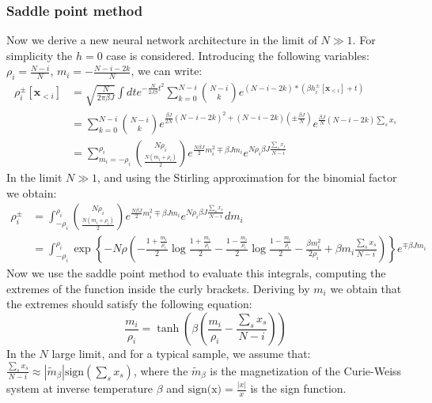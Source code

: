 \documentclass{article}
\begin{document}
\subsubsection{Saddle point method}
Now we derive a new neural network architecture in the limit of $N \gg 1$. For simplicity the $h=0$ case is considered. Introducing the following variables: $\rho_i = \frac{N-i}{N}$, $m_i = -\frac{N-i-2k}{N}$, we can write:
 \begin{align*}
 \rho_i^{\pm}[\mathbf{x}_{<i}] &= \sqrt{\frac{N}{2\pi \beta J}}\int dt e^{-\frac{N}{2J \beta}t^{2}} 
 \sum_{k=0}^{N-i} \binom{N-i}{k} e^{(N-i-2k)*(\beta h_i^{\pm}[\mathbf{x}_{<i}] + t)}\\
 &= \sum_{k=0}^{N-i} \binom{N-i}{k}e^{\frac{\beta J}{2N}\left(N-i-2k\right)^{2}+\left(N-i-2k\right)\left(\pm\frac{\beta J}{N}\right)} e^{\frac{\beta J}{N}\left(N-i-2k\right) \sum_s x_s} \\
 &= \sum_{m_i=-\rho_i}^{\rho_i} \binom{N\rho_i}{\frac{N(m_i+\rho_i)}{2}} e^{\frac{N \beta J}{2}m_i^{2} \mp \beta J m_i } e^{N \rho_i \beta J \frac{\sum_s x_s}{N-i}}
\end{align*}
In the limit $N \gg 1$, and using the Stirling approximation for the binomial factor we obtain:
 \begin{align*}
 \rho_i^{\pm} &= 
  \int_{-\rho_i}^{\rho_i} \binom{N\rho_i}{\frac{N(m_i+\rho_i)}{2}} e^{\frac{N \beta J}{2}m_i^{2} \mp \beta J m_i } e^{N \rho_i \beta J \frac{\sum_s x_s}{N-i}} dm_i \\
& =  \int_{-\rho_i}^{\rho_i} \exp\left\{-N\rho\left( -\frac{1+\frac{m_i}{\rho_i}}{2} \log\frac{1+\frac{m_i}{\rho_i}}{2} - \frac{1-\frac{m_i}{\rho_i}}{2} \log\frac{1-\frac{m_i}{\rho_i}}{2}   - \frac{\beta m_i^2}{2 \rho_i} + \beta m_i \frac{\sum_s x_s}{N-i}\right) \right\} e^{\mp \beta J m_i}
\end{align*}
Now we use the saddle point method to evaluate this integrals, computing the extremes of the function inside the curly brackets. Deriving by $m_i$ we obtain that the extremes should satisfy the following equation:
\begin{equation}
\frac{m_i}{\rho_i} = \tanh \left( \beta(\frac{m_i}{\rho_i} - \frac{\sum_s x_s}{N-i}) \right)
\label{eq:extrem_i}
\end{equation}
In the $N$ large limit, and for a typical sample, we assume that: $\frac{\sum_s x_s}{N-i} \approx |\tilde{m}_{\beta}| \text{sign}(\sum_s x_s)$, where the $\tilde{m}_{\beta}$ is the magnetization of the Curie-Weiss system at inverse temperature $\beta$ and $\text{sign(x)} = \frac{|x|}{x}$ is the sign function.
\end{document}
